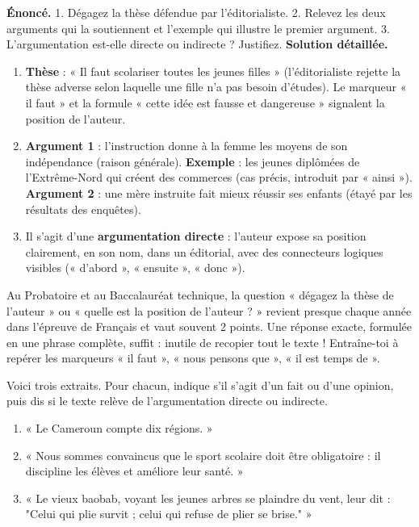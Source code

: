 \documentclass[11pt]{article}
\begin{document}
\begin{exoresolu}
\textbf{Énoncé.} 1. Dégagez la thèse défendue par l'éditorialiste. 2. Relevez les deux arguments qui la soutiennent et l'exemple qui illustre le premier argument. 3. L'argumentation est-elle directe ou indirecte ? Justifiez.
\tcblower
\textbf{Solution détaillée.}
\begin{enumerate}
\item \textbf{Thèse} : « Il faut scolariser toutes les jeunes filles » (l'éditorialiste rejette la thèse adverse selon laquelle une fille n'a pas besoin d'études). Le marqueur « il faut » et la formule « cette idée est fausse et dangereuse » signalent la position de l'auteur.
\item \textbf{Argument 1} : l'instruction donne à la femme les moyens de son indépendance (raison générale). \textbf{Exemple} : les jeunes diplômées de l'Extrême-Nord qui créent des commerces (cas précis, introduit par « ainsi »). \textbf{Argument 2} : une mère instruite fait mieux réussir ses enfants (étayé par les résultats des enquêtes).
\item Il s'agit d'une \textbf{argumentation directe} : l'auteur expose sa position clairement, en son nom, dans un éditorial, avec des connecteurs logiques visibles (« d'abord », « ensuite », « donc »).
\end{enumerate}
\end{exoresolu}

\begin{savaistu}
Au Probatoire et au Baccalauréat technique, la question « dégagez la thèse de l'auteur » ou « quelle est la position de l'auteur ? » revient presque chaque année dans l'épreuve de Français et vaut souvent 2 points. Une réponse exacte, formulée en une phrase complète, suffit : inutile de recopier tout le texte ! Entraîne-toi à repérer les marqueurs « il faut », « nous pensons que », « il est temps de ».
\end{savaistu}

\begin{exercice}
Voici trois extraits. Pour chacun, indique s'il s'agit d'un fait ou d'une opinion, puis dis si le texte relève de l'argumentation directe ou indirecte.
\begin{enumerate}
\item « Le Cameroun compte dix régions. »
\item « Nous sommes convaincus que le sport scolaire doit être obligatoire : il discipline les élèves et améliore leur santé. »
\item « Le vieux baobab, voyant les jeunes arbres se plaindre du vent, leur dit : "Celui qui plie survit ; celui qui refuse de plier se brise." »
\end{enumerate}
\end{exercice}
\end{document}
